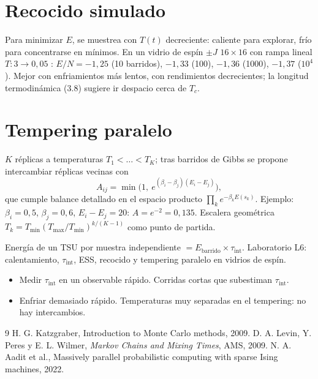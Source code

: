 \documentclass[11pt,a4paper]{article}
\begin{document}
\section{Recocido simulado}
Para minimizar $E$, se muestrea con $T(t)$ decreciente: caliente para explorar, frío para concentrarse en mínimos. En un vidrio de espín $\pm J$
$16\times16$ con rampa lineal $T:3\to0{,}05$ \evS: $E/N=-1{,}25$ (10 barridos), $-1{,}33$ (100), $-1{,}36$ (1000), $-1{,}37$ ($10^4$). Mejor con
enfriamientos más lentos, con rendimientos decrecientes; la longitud termodinámica (3.8) sugiere ir despacio cerca de $T_c$.

\section{Tempering paralelo}
$K$ réplicas a temperaturas $T_1<\dots<T_K$; tras barridos de Gibbs se propone intercambiar réplicas vecinas con
\begin{equation}
A_{ij}=\min\big(1,\ e^{(\beta_i-\beta_j)(E_i-E_j)}\big),
\end{equation}
que cumple balance detallado en el espacio producto $\prod_k e^{-\beta_kE(s_k)}$. Ejemplo: $\beta_i=0{,}5$, $\beta_j=0{,}6$, $E_i-E_j=20$:
$A=e^{-2}=0{,}135$. Escalera geométrica $T_k=T_{\min}(T_{\max}/T_{\min})^{k/(K-1)}$ como punto de partida.

\begin{aplicacion}
Energía de un TSU por muestra independiente $=E_{\text{barrido}}\times\tau_{\text{int}}$. Laboratorio L6: calentamiento, $\tau_{\text{int}}$, ESS, recocido y
tempering paralelo en vidrios de espín.
\end{aplicacion}

\begin{error}
\begin{itemize}[nosep]
\item Medir $\tau_{\text{int}}$ en un observable rápido. \quad Corridas cortas que subestiman $\tau_{\text{int}}$.
\item Enfriar demasiado rápido. \quad Temperaturas muy separadas en el tempering: no hay intercambios.
\end{itemize}
\end{error}

\begin{thebibliography}{9}\small
{} H. G. Katzgraber, Introduction to Monte Carlo methods, 2009.
 D. A. Levin, Y. Peres y E. L. Wilmer, \emph{Markov Chains and Mixing Times}, AMS, 2009.
 N. A. Aadit et al., Massively parallel probabilistic computing with sparse Ising machines, 2022.
\end{thebibliography}
\end{document}
